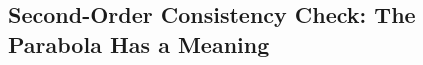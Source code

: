 














%

\subsection{Second-Order Consistency Check: The Parabola Has a Meaning}
\label{sec:walk-second-order-check}

